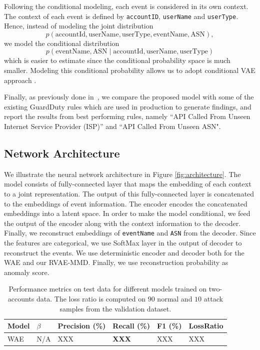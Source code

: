\documentclass{article}
\theoremstyle{plain}
\theoremstyle{definition}
\begin{document}
Following the conditional modeling, each event is considered in its own context. The context of each event is defined by \texttt{accountID}, \texttt{userName} and \texttt{userType}. Hence, instead of  modeling the joint distribution 
\begin{equation}
p(\textrm{accountId}, \textrm{userName}, \textrm{userType}, \textrm{eventName}, \textrm{ASN}), \nonumber
\end{equation}
 we model the conditional distribution 
 \begin{equation}
 p(\textrm{eventName}, \textrm{ASN} \mid \textrm{accountId}, \textrm{userName}, \textrm{userType}) \nonumber
\end{equation} 
  which is easier to estimate since the conditional probability space is much smaller. Modeling  this conditional probability allows us to adopt conditional VAE approach \cite{sohn2015learning}.

Finally, as previously done in~\cite{coskun2019detecting}, we compare the proposed model with some of the existing GuardDuty rules which are used in production to generate findings,
and report the results from best performing rules, namely “API Called From Unseen Internet Service Provider (ISP)” and “API Called From Unseen ASN".

\subsection{Network Architecture}
We illustrate the neural network architecture in Figure \ref{fig:architecture}. The model consists of fully-connected layer that maps the embedding of each context to a joint representation. The output of this fully-connected layer is concatenated to the embeddings of event information. The encoder encodes the concatenated embeddings into a latent space. In order to make the model conditional, we feed the output of the encoder along with the context information to the decoder. Finally, we reconstruct embeddings of  \texttt{eventName} and \texttt{ASN} from the decoder. Since the features are categorical, we use SoftMax layer in the output of decoder to reconstruct the events.
We use deterministic encoder and decoder both for  the WAE and our RVAE-MMD. Finally, we use reconstruction probability as anomaly score.
\begin{table}[h!]
	\centering
	\begin{tabular}{lp{.8cm}p{1.3cm}p{1.3cm}p{1.3cm}p{1.3cm}}
			\toprule
		\textbf{Model}  &$\beta$ &\textbf{Precision} (\%) & \textbf{Recall} (\%)  &\textbf{F1} (\%) & \textbf{LossRatio} \\
		\midrule
		WAE & N/A & XXX & \textbf{XXX} & XXX & XXX \\

		\bottomrule
	\end{tabular}
	\caption{Performance metrics on test data for different models trained on two-accounts data. The loss ratio is computed on $90$ normal and $10$ attack samples from the validation dataset.}
\label{tab:two_accounts}
\end{table}
\end{document}
